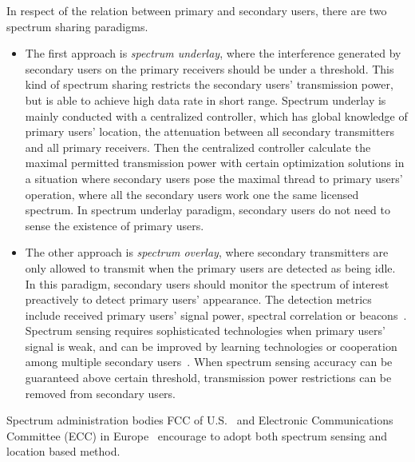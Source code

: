 In respect of the relation between primary and secondary users, there are two spectrum sharing paradigms.
\begin{itemize}
\item The first approach is \textit{spectrum underlay}, where the interference generated by secondary users on the primary receivers should be under a threshold. 
This kind of spectrum sharing restricts the secondary users' transmission power, but is able to achieve high data rate in short range.
Spectrum underlay is mainly conducted with a centralized controller, which has global knowledge of primary users' location, the attenuation between all secondary transmitters and all primary receivers.
Then the centralized controller calculate the maximal permitted transmission power with certain optimization solutions in a situation where secondary users pose the maximal thread to primary users' operation, where all the secondary users work one the same licensed spectrum.
In spectrum underlay paradigm, secondary users do not need to sense the existence of primary users.

\item The other approach is \textit{spectrum overlay}, where secondary transmitters are only allowed to transmit when the primary users are detected as being idle.
In this paradigm, secondary users should monitor the spectrum of interest preactively to detect primary users' appearance.
The detection metrics include received primary users' signal power, spectral correlation or beacons~\cite{crnsensing_09}.
Spectrum sensing requires sophisticated technologies when primary users' signal is weak, and can be improved by learning technologies or cooperation among multiple secondary users~\cite{coorperativeSensing_Akyildiz11}.
When spectrum sensing accuracy can be guaranteed above certain threshold, transmission power restrictions can be removed from  secondary users.
\end{itemize}

%


Spectrum administration bodies FCC of U.S.~\cite{FCC_2010_sedond_memorandumm} and Electronic Communications Committee (ECC) in Europe~\cite{ecc159} encourage to adopt both spectrum sensing and location based method.


